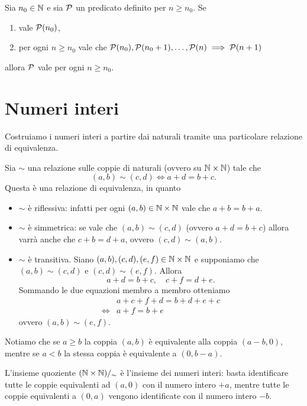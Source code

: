 \begin{theorem}
     Sia $n_0 \in \mathbb{N}$ e sia $\mathcal{P}$ un predicato definito per $n \geq n_0$. Se \begin{enumerate}
        \item vale $\mathcal{P}(n_0)$,
        \item per ogni $n \geq n_0$ vale che $\mathcal{P}(n_0), \mathcal{P}(n_0 + 1), \dots, \mathcal{P}(n) \implies \mathcal{P}(n+1)$
    \end{enumerate}
    allora $\mathcal{P}$ vale per ogni $n \geq n_0$.
\end{theorem}

\section{Numeri interi}

Costruiamo i numeri interi a partire dai naturali tramite una particolare relazione di equivalenza.

Sia $\sim$ una relazione sulle coppie di naturali (ovvero su $\mathbb{N} \times \mathbb{N}$) tale che \[
    (a, b) \sim (c, d) \iff a + d = b + c.
\]
Questa è una relazione di equivalenza, in quanto \begin{itemize}
    \item $\sim$ è riflessiva: infatti per ogni $(a, b) \in \mathbb{N} \times \mathbb{N}$ vale che $a + b = b + a$.
    \item $\sim$ è simmetrica: se vale che $(a, b) \sim (c, d)$ (ovvero $a + d = b + c$) allora varrà anche che $c + b = d + a$, ovvero $(c, d) \sim (a, b)$.
    \item $\sim$ è transitiva. Siano $(a, b), (c, d), (e, f) \in \mathbb{N} \times \mathbb{N}$ e supponiamo che $(a, b) \sim (c, d)$ e $(c, d) \sim (e, f)$. Allora \[
        a + d = b + c, \quad c + f = d + e.    
    \] Sommando le due equazioni membro a membro otteniamo \begin{align*}
        &a + c + f + d = b + d + e + c \\
        \iff &a + f = b + e  
    \end{align*} ovvero $(a, b) \sim (e, f)$.
\end{itemize}

Notiamo che se $a \geq b$ la coppia $(a, b)$ è equivalente alla coppia $(a-b, 0)$, mentre se $a < b$ la stessa coppia è equivalente a $(0, b-a)$.

L'insieme quoziente $(\mathbb{N} \times \mathbb{N})/_{\sim}$ è l'insieme dei numeri interi: basta identificare tutte le coppie equivalenti ad $(a, 0)$ con il numero intero $+a$, mentre tutte le coppie equivalenti a $(0, a)$ vengono identificate con il numero intero $-b$.

